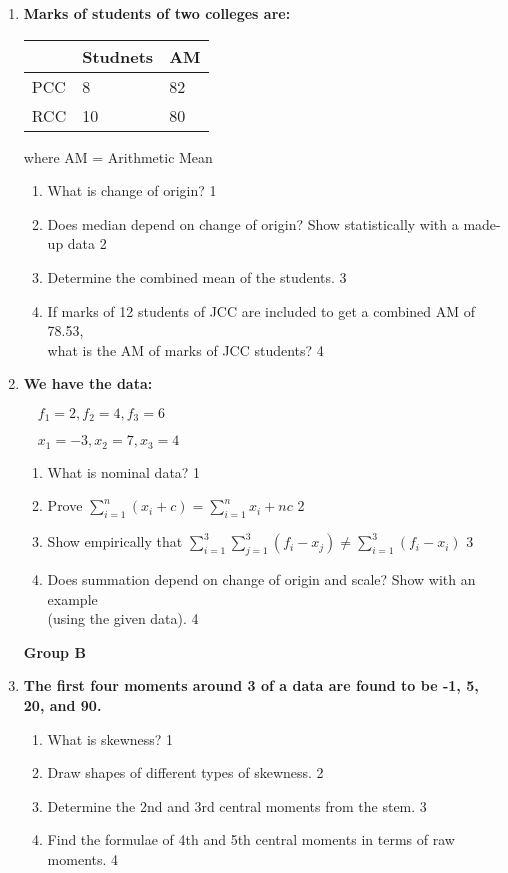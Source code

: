 \documentclass{article}
\begin{document}
\begin{enumerate}
  \item
  \textbf{Marks of students of two colleges are:}
\begin{table}[h]
 \begin{center}
\begin{tabular}{l|l|l}
    & Studnets & AM \\ \hline
PCC & 8        & 82 \\ \hline
RCC & 10       & 80
\end{tabular}
\end{center}
\end{table}
where AM = Arithmetic Mean
  \begin{enumerate}
    \item
	What is change of origin? \hfill 1
    \item
	Does median depend on change of origin? Show statistically with a made-up data \hfill 2
    \item  
	Determine the combined mean of the students. \hfill 3
    \item
	If marks of 12 students of JCC are included to get a combined AM of 78.53, \\ what is the AM of marks of JCC students? \hfill 4
\end{enumerate}

  \item
	  \textbf{We have the data:}
	
	$\quad f_1=2, f_2 = 4, f_3 = 6$

	$\quad x_1 = -3, x_2 =7, x_3 = 4$

  \begin{enumerate}
    \item
	What is nominal data? \hfill 1
    \item
	Prove $\displaystyle \sum_{i=1}^{n} (x_i+c)=\sum_{i=1}^{n} x_i + nc$ \hfill 2
    \item  
	Show empirically that $\displaystyle \sum_{i=1}^{3} \sum_{j=1}^{3}(f_i-x_j) \ne \sum_{i=1}^{3} (f_i-x_i)$ \hfill 3
    \item
	Does summation depend on change of origin and scale? Show with an example\\ (using the given data).  \hfill 4
\end{enumerate}

\begin{center}
\textbf{Group B}
\end{center}

 \item
	  \textbf{The first four moments around 3 of a data are found to be -1, 5, 20, and 90.  }
  \begin{enumerate}
    \item
	What is skewness? \hfill 1
    \item
	Draw shapes of different types of skewness. \hfill 2
    \item  
	Determine the 2nd and 3rd central moments from the stem. \hfill 3
    \item
	Find the formulae of 4th and 5th central moments in terms of raw moments. \hfill 4
\end{enumerate}


\end{enumerate}
\end{document}
